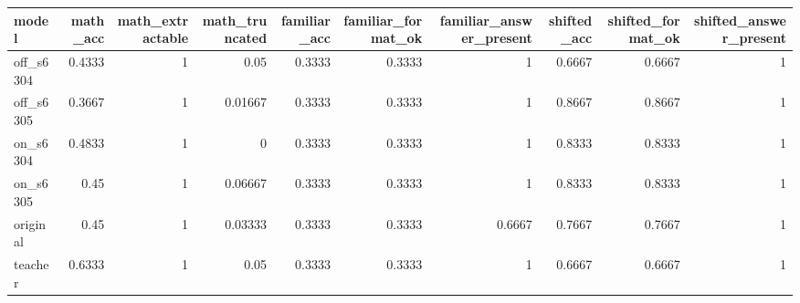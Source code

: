 \begin{table}
\label{tab:task3_standalone_accuracy}
\begin{tabular}{lrrrrrrrrr}
\toprule
model & math\_acc & math\_extractable & math\_truncated & familiar\_acc & familiar\_format\_ok & familiar\_answer\_present & shifted\_acc & shifted\_format\_ok & shifted\_answer\_present \\
\midrule
off\_s6304 & 0.4333 & 1 & 0.05 & 0.3333 & 0.3333 & 1 & 0.6667 & 0.6667 & 1 \\
off\_s6305 & 0.3667 & 1 & 0.01667 & 0.3333 & 0.3333 & 1 & 0.8667 & 0.8667 & 1 \\
on\_s6304 & 0.4833 & 1 & 0 & 0.3333 & 0.3333 & 1 & 0.8333 & 0.8333 & 1 \\
on\_s6305 & 0.45 & 1 & 0.06667 & 0.3333 & 0.3333 & 1 & 0.8333 & 0.8333 & 1 \\
original & 0.45 & 1 & 0.03333 & 0.3333 & 0.3333 & 0.6667 & 0.7667 & 0.7667 & 1 \\
teacher & 0.6333 & 1 & 0.05 & 0.3333 & 0.3333 & 1 & 0.6667 & 0.6667 & 1 \\
\bottomrule
\end{tabular}
\end{table}
